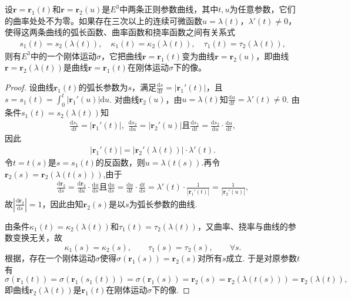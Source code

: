 \documentclass[../../main.tex]{subfiles}%
\begin{document}
\begin{corollary}
设$\bm{r} = \bm{r}_1(t)$和$\bm{r} = \bm{r}_2(u)$是$E^3$中两条正则参数曲线，其中$t,u$为任意参数，它们的曲率处处不为零。如果存在三次以上的连续可微函数$u = \lambda(t)$，$\lambda'(t) \neq 0$，使得这两条曲线的弧长函数、曲率函数和挠率函数之间有关系式
\begin{align}
s_1(t) = s_2(\lambda(t)),\quad \kappa_1(t) = \kappa_2(\lambda(t)),\quad \tau_1(t) = \tau_2(\lambda(t)),
\label{eq:--3ur0jfdjgijiL:LIHFIOAWHFNASawf5.4}
\end{align}
则有$E^3$中的一个刚体运动$\sigma$，它把曲线$\bm{r} = \bm{r}_1(t)$变为曲线$\bm{r} = \bm{r}_2(u)$，即曲线$\bm{r} = \bm{r}_2(\lambda(t))$是曲线$\bm{r} = \bm{r}_1(t)$在刚体运动$\sigma$下的像。
\end{corollary}
\begin{proof}

设曲线$\bm{r}_1(t)$的弧长参数为$s$，满足$\frac{\mathrm{d}s}{\mathrm{d}t}=|\bm{r}_1'(t)|$，且$s=s_1(t)=\int_0^t|\bm{r}_1'(u)|\mathrm{d}u$. 对曲线$\bm{r}_2(u)$，由$u=\lambda(t)$知$\frac{\mathrm{d}u}{\mathrm{d}t}=\lambda'(t)\neq0$. 由条件$s_1(t)=s_2(\lambda(t))$知
\begin{align*}
\frac{\mathrm{d}s_1}{\mathrm{d}t}=|\bm{r}_1'(t)|,\,\,\frac{\mathrm{d}s_2}{\mathrm{d}u}=|\bm{r}_2'(u)|\text{且}\frac{\mathrm{d}s_1}{\mathrm{d}t}=\frac{\mathrm{d}s_2}{\mathrm{d}u}\cdot\frac{\mathrm{d}u}{\mathrm{d}t},
\end{align*}
因此
\begin{align*}
|\bm{r}_1'(t)|=|\bm{r}_2'(\lambda(t))|\cdot\lambda'(t).
\end{align*}
令$t=t(s)$是$s=s_1(t)$的反函数，则$u=\lambda(t(s))$.再令$\bm{r}_2(s)=\bm{r}_2(\lambda(t(s)))$,由于
\begin{align*}
\frac{\mathrm{d}\bm{r}_2}{\mathrm{d}s}=\frac{\mathrm{d}\bm{r}_2}{\mathrm{d}u}\cdot\frac{\mathrm{d}u}{\mathrm{d}s}\text{且}\frac{\mathrm{d}u}{\mathrm{d}s}=\frac{\mathrm{d}u}{\mathrm{d}t}\cdot\frac{\mathrm{d}t}{\mathrm{d}s}=\lambda'(t)\cdot\frac{1}{|\bm{r}_1'(t)|}= \frac{1}{|\bm{r}_2'(u)|},
\end{align*}
故$\left|\frac{\mathrm{d}\bm{r}_2}{\mathrm{d}s}\right|=1$，因此由知$\bm{r}_2(s)$是以$s$为弧长参数的曲线.

由条件$\kappa_1(t)=\kappa_2(\lambda(t))$和$\tau_1(t)=\tau_2(\lambda(t))$，又曲率、挠率与曲线的参数变换无关，故
\[
\kappa_1(s)=\kappa_2(s),\qquad \tau_1(s)=\tau_2(s),\qquad \forall s.
\]
根据，存在一个刚体运动$\sigma$使得$\sigma(\bm{r}_1(s))=\bm{r}_2(s)$对所有$s$成立. 于是对原参数$t$有
\[
\sigma \left( \boldsymbol{r}_1\left( t \right) \right) =\sigma \left( \boldsymbol{r}_1\left( s_1\left( t \right) \right) \right) =\sigma \left( \boldsymbol{r}_1\left( s \right) \right) =\boldsymbol{r}_2\left( s \right) =\boldsymbol{r}_2\left( \lambda \left( t\left( s \right) \right) \right) =\boldsymbol{r}_2\left( \lambda \left( t \right) \right) ,
\]
即曲线$\bm{r}_2(\lambda(t))$是$\bm{r}_1(t)$在刚体运动$\sigma$下的像.

\end{proof}
\end{document}

